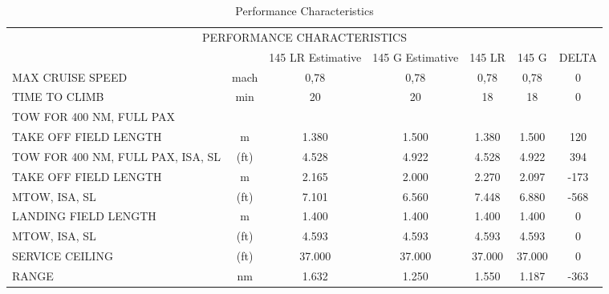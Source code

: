 \begin{table}[htbp]
  \centering
  \scriptsize
  \caption{Performance Characteristics}
    \begin{tabular}{rcccccc}
    \toprule
    \multicolumn{7}{c}{\multirow{2}[1]{*}{PERFORMANCE CHARACTERISTICS}} \\
   
    \multicolumn{7}{c}{} \\
    \multicolumn{2}{c}{} & 145 LR Estimative & 145 G Estimative & 145 LR & 145 G & DELTA \\
     \midrule
    \multicolumn{1}{l}{\multirow{2}[2]{*}{MAX CRUISE SPEED}} & \multirow{2}[2]{*}{mach} & \multirow{2}[2]{*}{0,78} & \multirow{2}[2]{*}{0,78} & \multirow{2}[2]{*}{0,78} & \multirow{2}[2]{*}{0,78} & \multirow{2}[2]{*}{0} \\
    \multicolumn{1}{l}{} &       &       &       &       &       &  \\
    \multicolumn{1}{l}{TIME TO CLIMB} & \multirow{2}[2]{*}{min} & \multirow{2}[2]{*}{20} & \multirow{2}[2]{*}{20} & \multirow{2}[2]{*}{18} & \multirow{2}[2]{*}{18} & \multirow{2}[2]{*}{0} \\
    \multicolumn{1}{l}{TOW FOR 400 NM, FULL PAX} &       &       &       &       &       &  \\
    \multicolumn{1}{l}{TAKE OFF FIELD LENGTH} & m     & 1.380 & 1.500 & 1.380 & 1.500 & 120 \\
    \multicolumn{1}{l}{TOW FOR 400 NM, FULL PAX, ISA, SL} & (ft)  & 4.528 & 4.922 & 4.528 & 4.922 & 394 \\
    \multicolumn{1}{l}{TAKE OFF FIELD LENGTH} & m     & 2.165 & 2.000 & 2.270 & 2.097 & -173 \\
    \multicolumn{1}{l}{MTOW, ISA, SL} & (ft)  & 7.101 & 6.560 & 7.448 & 6.880 & -568 \\
    \multicolumn{1}{l}{LANDING FIELD LENGTH} & m     & 1.400 & 1.400 & 1.400 & 1.400 & 0 \\
    \multicolumn{1}{l}{MTOW, ISA, SL} & (ft)  & 4.593 & 4.593 & 4.593 & 4.593 & 0 \\
    \multicolumn{1}{l}{\multirow{2}[2]{*}{SERVICE CEILING}} & \multirow{2}[2]{*}{(ft)} & \multirow{2}[2]{*}{37.000} & \multirow{2}[2]{*}{37.000} & \multirow{2}[2]{*}{37.000} & \multirow{2}[2]{*}{37.000} & \multirow{2}[2]{*}{0} \\
    \multicolumn{1}{l}{} &       &       &       &       &       &  \\
    \multicolumn{1}{l}{RANGE} & nm    & 1.632 & 1.250 & 1.550 & 1.187 & -363 \\

\end{tabular}
\end{table}
